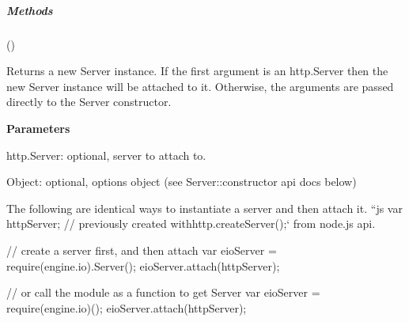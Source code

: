 \subparagraph*{Methods}


\begin{DoxyItemize}
\item {\ttfamily ()}
\begin{DoxyItemize}
\item Returns a new {\ttfamily Server} instance. If the first argument is an {\ttfamily http.\+Server} then the new {\ttfamily Server} instance will be attached to it. Otherwise, the arguments are passed directly to the {\ttfamily Server} constructor.
\item {\bfseries Parameters}
\begin{DoxyItemize}
\item {\ttfamily http.\+Server}\+: optional, server to attach to.
\item {\ttfamily Object}\+: optional, options object (see {\ttfamily Server\+::constructor} api docs below)
\end{DoxyItemize}
\end{DoxyItemize}

The following are identical ways to instantiate a server and then attach it. ``{\ttfamily js var http\+Server; // previously created with}http.\+create\+Server();` from node.\+js api.

// create a server first, and then attach var eio\+Server = require(\textquotesingle{}engine.\+io\textquotesingle{}).Server(); eio\+Server.\+attach(http\+Server);

// or call the module as a function to get {\ttfamily Server} var eio\+Server = require(\textquotesingle{}engine.\+io\textquotesingle{})(); eio\+Server.\+attach(http\+Server);


\end{DoxyItemize}
